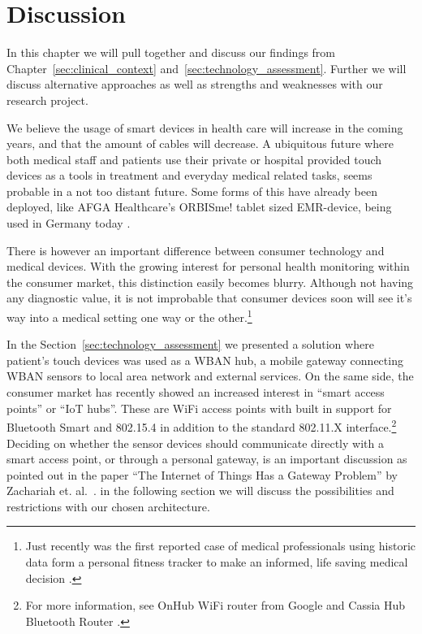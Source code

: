 \section{Discussion} %
\label{sec:discussion}

In this chapter we will pull together and discuss our findings from Chapter~\ref{sec:clinical_context} and~\ref{sec:technology_assessment}. Further we will discuss alternative approaches as well as strengths and weaknesses with our research project. 

We believe the usage of smart devices in health care will increase in the coming years, and that the amount of cables will decrease. A ubiquitous future where both medical staff and patients use their private or hospital provided touch devices as a tools in treatment and everyday medical related tasks, seems probable in a not too distant future. Some forms of this have already been deployed, like AFGA Healthcare's ORBISme! tablet sized EMR-device, being used in Germany today \cite{newRef:271}. 

There is however an important difference between consumer technology and medical devices. With the growing interest for personal health monitoring within the consumer market, this distinction easily becomes blurry. Although not having any diagnostic value, it is not improbable that consumer devices soon will see it's way into a medical setting one way or the other.\footnote{ Just recently was the first reported case of medical professionals using historic data form a personal fitness tracker to make an informed, life saving medical decision \cite{newRef:29}.}

In the Section~\ref{sec:technology_assessment} we presented a solution where patient's touch devices was used as a WBAN hub, a mobile gateway connecting WBAN sensors to local area network and external services. On the same side, the consumer market has recently showed an increased interest in ``smart access points'' or ``IoT hubs''. These are WiFi access points with built in support for Bluetooth Smart and 802.15.4 in addition to the standard 802.11.X interface.\footnote{ For more information, see OnHub WiFi router from Google \cite{newRef:60} and Cassia Hub Bluetooth Router \cite{newRef:61}.} Deciding on whether the sensor devices should communicate directly with a smart access point, or through a personal gateway, is an important discussion as pointed out in the paper ``The Internet of Things Has a Gateway Problem'' by Zachariah et. al.~\cite{Zachariah:2015cm}. in the following section we will discuss the possibilities and restrictions with our chosen architecture.

